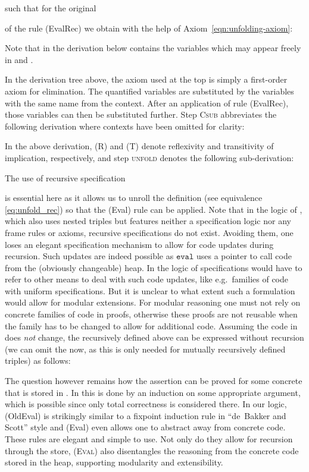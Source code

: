 \documentclass{LMCS}
\theoremstyle{remark}
\newcommand{\SYN}[1]{\ensuremath{\texttt{#1}}}
\begin{document}
 such that for the original 
 
  of the rule  ({\sc EvalRec}) we obtain with the help of Axiom~\eqref{eqn:unfolding-axiom}:

 Note that  in the derivation below  contains the variables  which may appear freely in  and .

In the derivation tree above, the axiom used at the top is simply a first-order axiom for  elimination. The quantified variables  are substituted by the variables  with the same name from the context.
After an application of rule ({\sc EvalRec}), those variables  can then be substituted further.
Step \textsc{Csub} abbreviates the following derivation where contexts have been omitted for clarity:
 

In the above derivation, (\textsc{R}) and (\textsc{T}) denote reflexivity and transitivity of implication, respectively, and step \textsc{unfold} denotes the following sub-derivation:


 The use of recursive specification 
 
  is essential here as it allows us to unroll the definition (see equivalence \eqref{eq:unfold_rec}) so that the ({\sc Eval}) rule can be applied. Note that in the logic of \cite{Honda:Yoshida:Berger:05}, which also uses nested triples  
 but  features neither a specification logic nor  any  frame rules or axioms,  recursive specifications do not exist. 
Avoiding them, one loses an elegant specification mechanism to allow for code updates during   recursion. Such updates are indeed possible as   \SYN{eval} uses a pointer to call code from the (obviously changeable) heap. In the logic of  \cite{Honda:Yoshida:Berger:05}   specifications would have to refer to other means to deal with such code updates, like e.g.\ families of code with uniform specifications. But  it is unclear to what extent such a formulation would allow for modular extensions. For modular reasoning one must not rely on concrete families of code in proofs,  otherwise these proofs are not reusable when the family has to be changed to allow for additional code.   Assuming the code in  does \emph{not} change, the  recursively defined  above can be expressed without recursion (we can omit the  now, as this is only needed for mutually recursively defined triples) as follows: 
 
 The question however remains how the assertion  can be proved for some concrete    that is stored in . In  \cite{Honda:Yoshida:Berger:05}  this is done by an induction on some appropriate argument, which is possible since only  total correctness  is considered there.    
In our logic,    ({\sc OldEval}) is strikingly  similar to a fixpoint induction  rule in ``de~Bakker and Scott'' style and ({\sc Eval}) even allows one to    abstract away from concrete code. These rules are elegant and simple  to use. Not only do they allow for recursion through the store, (\textsc{Eval}) also disentangles the reasoning from the concrete code stored in the heap, supporting modularity and extensibility.
  
\end{document}
